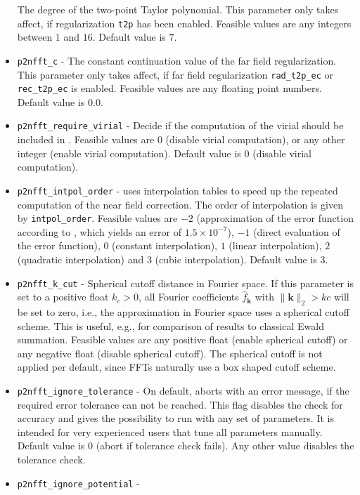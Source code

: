 \begin{itemize}
    The degree of the two-point Taylor polynomial. This parameter only takes affect, if regularization \verb!t2p! has been enabled.
    Feasible values are any integers between $1$ and $16$. Default value is $7$.
  \item \verb!p2nfft_c! -
    The constant continuation value of the far field regularization. This parameter only takes affect, if far field regularization \verb!rad_t2p_ec! or \verb!rec_t2p_ec! is enabled.
    Feasible values are any floating point numbers. Default value is $0.0$.
  \item \verb!p2nfft_require_virial! -
    Decide if the computation of the virial should be included in \ptwonfft.
    Feasible values are $0$ (disable virial computation), or any other integer (enable virial computation).
    Default value is $0$ (disable virial computation).
  \item \verb!p2nfft_intpol_order! -
    \ptwonfft uses interpolation tables to speed up the repeated computation of the near field correction. The order of interpolation is given by \verb!intpol_order!.
    Feasible values are $-2$ (approximation of the error function according to \cite[eq.~(7.1.26)]{AbSt72}, which yields an error of $1.5\times 10^{-7}$),
    $-1$ (direct evaluation of the error function), $0$ (constant interpolation), $1$ (linear interpolation), $2$ (quadratic interpolation) and $3$ (cubic interpolation).
    Default value is $3$.
  \item \verb!p2nfft_k_cut! -
    Spherical cutoff distance in Fourier space. If this parameter is set to a positive float $k_c>0$, all Fourier coefficients $\hat f_{\mathbf k}$ with
    $\|\mathbf k\|_2 > kc$ will be set to zero, i.e., the approximation in Fourier space uses a spherical cutoff scheme.
    This is useful, e.g., for comparison of results to classical Ewald summation.
    Feasible values are any positive float (enable spherical cutoff) or any negative float (disable spherical cutoff).
    The spherical cutoff is not applied per default, since FFTs naturally use a box shaped cutoff scheme.
  \item \verb!p2nfft_ignore_tolerance! -
    On default, \ptwonfft aborts with an error message, if the required error tolerance can not be reached.
    This flag disables the check for accuracy and gives the possibility to run \ptwonfft
    with any set of parameters. It is intended for very experienced users that tune all parameters manually.
    Default value is $0$ (abort if tolerance check fails). Any other value disables the tolerance check.
  \item \verb!p2nfft_ignore_potential! -

\end{itemize}
